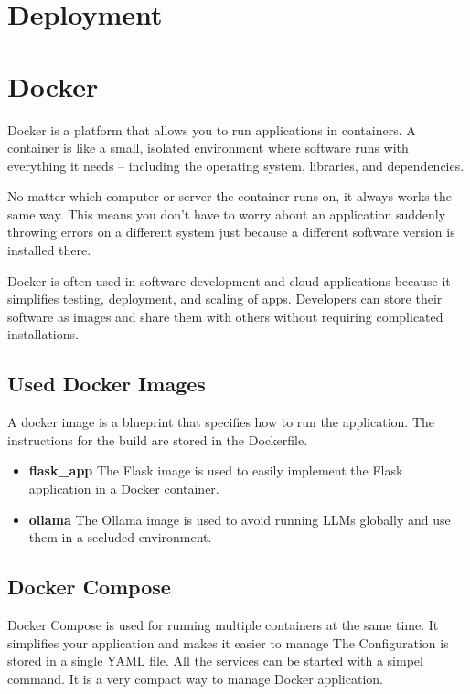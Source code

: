 \section{Deployment}



\section{Docker}
\label{sec:docker}
Docker is a platform that allows you to run applications in containers. A container is like a small, isolated environment where software runs with everything it needs – including the operating system, libraries, and dependencies.

No matter which computer or server the container runs on, it always works the same way. This means you don’t have to worry about an application suddenly throwing errors on a different system just because a different software version is installed there.

Docker is often used in software development and cloud applications because it simplifies testing, deployment, and scaling of apps. Developers can store their software as images and share them with others without requiring complicated installations.

\subsection{Used Docker Images}
A docker image is a blueprint that specifies how to run the application. The instructions for the build are stored in the Dockerfile.
\cite{dockerize_flask} 

\begin{itemize}
    \item \textbf{flask\_app} The Flask image is used to easily implement the Flask application in a Docker container.
    \item \textbf{ollama} The Ollama image is used to avoid running LLMs globally and use them in a secluded environment.
\end{itemize}

\subsection{Docker Compose}
Docker Compose is used for running multiple containers at the same time. It simplifies your application and makes it easier to manage 
The Configuration is stored in a single YAML file. All the services can be started with a simpel command. It is a very compact way to manage Docker application.
\cite{docker_compose} 

